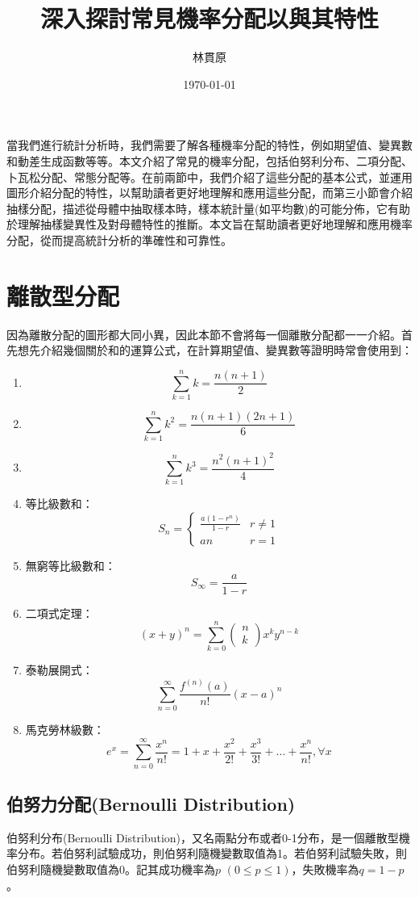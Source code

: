 \documentclass[12pt, a4paper]{article}
\title{深入探討常見機率分配以與其特性}
\author{{\KT 林貫原}}
\date{{\R \today }}
\begin{document}
\renewcommand{\tablename}{表}	
\renewcommand{\figurename}{圖}
\maketitle
\fontsize{12}{22pt}\selectfont 


當我們進行統計分析時，我們需要了解各種機率分配的特性，例如期望值、變異數和動差生成函數等等。本文介紹了常見的機率分配，包括伯努利分布、二項分配、卜瓦松分配、常態分配等。在前兩節中，我們介紹了這些分配的基本公式，並運用圖形介紹分配的特性，以幫助讀者更好地理解和應用這些分配，而第三小節會介紹抽樣分配，描述從母體中抽取樣本時，樣本統計量(如平均數)的可能分佈，它有助於理解抽樣變異性及對母體特性的推斷。本文旨在幫助讀者更好地理解和應用機率分配，從而提高統計分析的準確性和可靠性。
\section{離散型分配}
因為離散分配的圖形都大同小異，因此本節不會將每一個離散分配都一一介紹。首先想先介紹幾個關於和的運算公式，在計算期望值、變異數等證明時常會使用到：
\begin{enumerate}
\item $$\sum_{k=1}^nk=\frac{n(n+1)}{2}$$
\item $$\sum_{k=1}^nk^2=\frac{n(n+1)(2n+1)}{6}$$
\item $$\sum_{k=1}^nk^3=\frac{n^2(n+1)^2}{4}$$
\item 等比級數和：$${\displaystyle S_{n}={\begin{cases}{\frac {a(1-r^{n})}{1-r}}&r\neq 1\\an&r=1\end{cases}}}$$
\item 無窮等比級數和：$${\displaystyle S_{\infty }={\frac {a}{1-r}}}$$
\item 二項式定理：$$(x+y)^n=\sum_{k=0}^n\left(\begin{array}{c}n\\ k\end{array}\right)x^ky^{n-k}$$
\item 泰勒展開式：$$\sum_{n=0}^\infty\frac{f^{(n)}(a)}{n!}(x-a)^n$$
\item 馬克勞林級數：$$e^x=\sum_{n=0}^\infty\frac{x^n}{n!}=1+x+\frac{x^2}{2!}+\frac{x^3}{3!}+\dots+\frac{x^n}{n!},\forall x$$
\end{enumerate}
\subsection{伯努力分配(Bernoulli Distribution)}
伯努利分布(Bernoulli Distribution)，又名兩點分布或者0-1分布，是一個離散型機率分布。若伯努利試驗成功，則伯努利隨機變數取值為1。若伯努利試驗失敗，則伯努利隨機變數取值為0。記其成功機率為$p$ $(0\leq p\leq 1)$，失敗機率為$q=1-p$。
\end{document}
